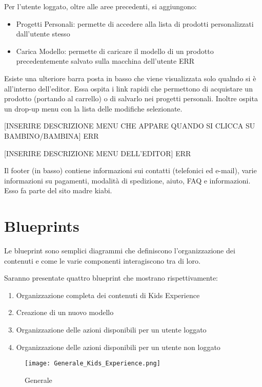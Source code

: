 \documentclass[12pt,italian,]{report}
\providecommand{\tightlist}{%
  \setlength{\itemsep}{0pt}\setlength{\parskip}{0pt}}
\begin{document}
Per l'utente loggato, oltre alle aree precedenti, si aggiungono:

\begin{itemize}
\tightlist
\item
  Progetti Personali: permette di accedere alla lista di prodotti
  personalizzati dall'utente stesso
\item
  Carica Modello: permette di caricare il modello di un prodotto
  precedentemente salvato sulla macchina dell'utente ERR
\end{itemize}

Esiste una ulteriore barra posta in basso che viene visualizzata solo
qualndo si è all'interno dell'editor. Essa ospita i link rapidi che
permettono di acquistare un prodotto (portando al carrello) o di
salvarlo nei progetti personali. Inoltre ospita un drop-up menu con la
lista delle modifiche selezionate.

{[}INSERIRE DESCRIZIONE MENU CHE APPARE QUANDO SI CLICCA SU
BAMBINO/BAMBINA{]} ERR

{[}INSERIRE DESCRIZIONE MENU DELL'EDITOR{]} ERR

Il footer (in basso) contiene informazioni sui contatti (telefonici ed
e-mail), varie informazioni su pagamenti, modalità di spedizione, aiuto,
FAQ e informazioni. Esso fa parte del sito madre kiabi.

\hypertarget{blueprints}{%
\section{Blueprints}\label{blueprints}}

Le blueprint sono semplici diagrammi che definiscono l'organizzazione
dei contenuti e come le varie componenti interagiscono tra di loro.

Saranno presentate quattro blueprint che mostrano rispettivamente:

\begin{enumerate}
\def\labelenumi{\arabic{enumi}.}
\tightlist
\item
  Organizzazione completa dei contenuti di Kids Experience
\item
  Creazione di un nuovo modello
\item
  Organizzazione delle azioni disponibili per un utente loggato
\item
  Organizzazione delle azioni disponibili per un utente non loggato
\end{enumerate}

\begin{figure}
\centering
\texttt{[image: Generale\_Kids\_Experience.png]}
\caption{Generale}
\end{figure}
\end{document}

